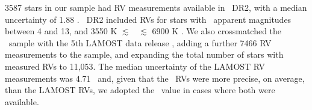 3587 stars in our sample had RV measurements available in \gaia\ DR2, with a
median uncertainty of 1.88 \kms.
\gaia\ DR2 included RVs for stars with \gaia\ apparent magnitudes between 4
and 13, and 3550 K $\lesssim$ \teff\ $\lesssim$ 6900 K \citep{brown2018}.
We also crossmatched the \mct\ sample with the 5th LAMOST data release
\citep{cui2012, xiang2019}, adding a further 7466 RV measurements to the
sample, and expanding the total number of stars with measured RVs to 11,053.
The median uncertainty of the LAMOST RV measurements was 4.71 \kms\ and,
given that the \gaia\ RVs were more precise, on average, than the LAMOST
RVs, we adopted the \gaia\ value in cases where both were available.
